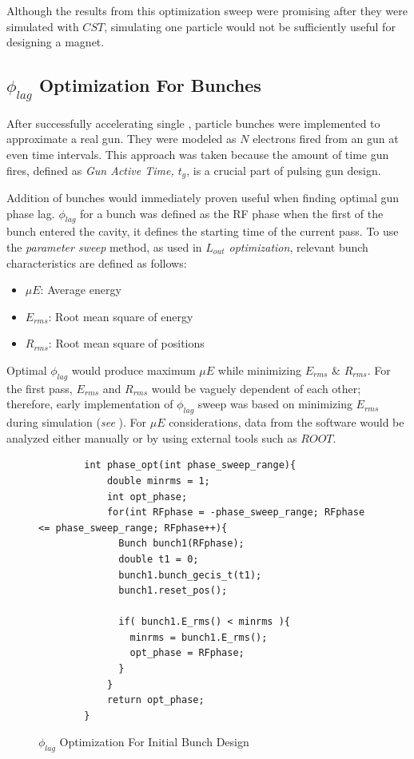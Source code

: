 \documentclass[a4paper,oneside,12pt]{report}
\numberwithin{equation}{chapter}
\begin{document}
Although the results from this optimization sweep were promising after they were simulated with $CST$, simulating one particle would not be sufficiently useful for designing a magnet.

\subsection{$\phi_{lag}$ Optimization For Bunches} \label{sec:philag_sweep}
After successfully accelerating single \e, particle bunches were implemented to approximate a real \e gun. 
They were modeled as $N$ electrons fired from an \e gun at even time intervals. This approach was taken because the amount of time gun fires, defined as \textit{Gun Active Time, $t_g$}, is a crucial part of pulsing \e gun design.

Addition of bunches would immediately proven useful when finding optimal gun phase lag.
$\phi_{lag}$ for a bunch was defined as the RF phase when the first \e of the bunch entered the cavity, it defines the starting time of the current pass.
To use the \textit{parameter sweep} method, as used in \textit{$L_{out}$ optimization}, relevant bunch characteristics are defined as follows:

\begin{itemize}
    \item $\mu E$: Average energy
    \item $E_{rms}$: Root mean square of energy
    \item $R_{rms}$: Root mean square of \e positions
\end{itemize}

Optimal $\phi_{lag}$ would produce maximum $\mu E$ while minimizing $E_{rms}$ \& $R_{rms}$. For the first pass, 
$E_{rms}$ and $R_{rms}$ would be vaguely dependent of each other; therefore, early implementation of $\phi_{lag}$ sweep was based on minimizing $E_{rms}$ during simulation (\textit{see }). 
For $\mu E$ considerations, data from the software would be analyzed either manually or by using external tools such as $ROOT$. 

\begin{figure}[H]
    \centering
    \captionsetup{justification=centering}
    \begin{verbatim}
        int phase_opt(int phase_sweep_range){
            double minrms = 1;
            int opt_phase;
            for(int RFphase = -phase_sweep_range; RFphase <= phase_sweep_range; RFphase++){
              Bunch bunch1(RFphase);
              double t1 = 0;
              bunch1.bunch_gecis_t(t1);
              bunch1.reset_pos();
        
              if( bunch1.E_rms() < minrms ){
                minrms = bunch1.E_rms();
                opt_phase = RFphase;
              }
            }
            return opt_phase;
        }
    \end{verbatim}
    \caption{$\phi_{lag}$ Optimization For Initial Bunch Design}
    \label{fig:phlag_opt}
\end{figure}
\end{document}

